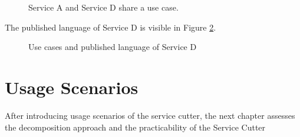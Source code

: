 \begin{figure}[H]
	\caption{Service A and Service D share a use case.}
	\label{fig:service-dependency}
\end{figure}

The published language of Service D is visible in Figure \ref{fig:service-publang}.

\begin{figure}[H]
	\caption{Use cases and published language of Service D}
	\label{fig:service-publang}
\end{figure}

\section{Usage Scenarios}




After introducing usage scenarios of the service cutter, the next chapter assesses the decomposition approach and the practicability of the Service Cutter

